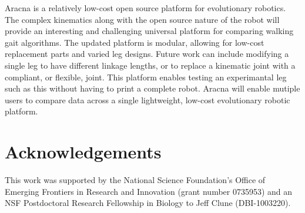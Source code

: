 \documentclass[letterpaper]{article}
\begin{document}
Aracna is a relatively low-cost open source platform for evolutionary robotics. The complex kinematics along with the open source nature of the robot will provide an interesting and challenging universal platform for comparing walking gait algorithms. The updated platform is modular, allowing for low-cost replacement parts and varied leg designs. Future work can include modifying a single leg to have different linkage lengths, or to replace a kinematic joint with a compliant, or flexible, joint. This platform enables testing an experimantal leg such as this without having to print a complete robot. Aracna will enable mutiple users to compare data across a single lightweight, low-cost evolutionary robotic platform.

\section{Acknowledgements}

This work was supported by the National Science Foundation's Office of
Emerging Frontiers in Research and Innovation (grant number 0735953) and an NSF Postdoctoral Research Fellowship in Biology to Jeff Clune (DBI-1003220).



\footnotesize


\end{document}
